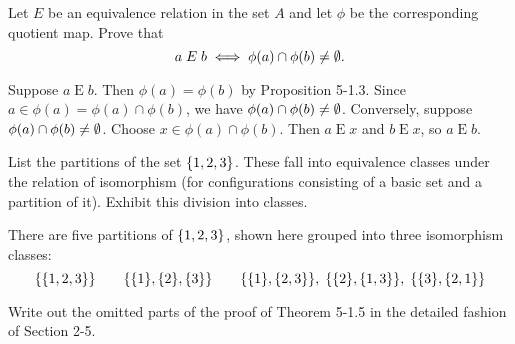 \documentclass{report}
\newcommand*{\Erel}{\mathrel{E}}
\begin{document}
\begin{exercise}
Let $E$ be an equivalence relation in the set $A$ and let $\phi$ be the corresponding quotient
map. Prove that
\[a\Erel b\iff \phi(a)\cap\phi(b)\neq\eset.\]
\end{exercise}

\begin{solution}
Suppose $a\Erel b$. Then $\phi(a)=\phi(b)$ by Proposition 5-1.3. Since $a\in\phi(a)=\phi(a)\cap\phi(b)$,
we have $\phi(a)\cap\phi(b)\neq\emptyset$.
Conversely, suppose $\phi(a)\cap\phi(b)\neq\emptyset$. Choose $x\in \phi(a)\cap\phi(b)$.
Then $a\Erel x$ and $b\Erel x$, so $a\Erel b$.
\end{solution}

\begin{exercise}
List the partitions of the set $\left\{1, 2,3\right\}$. These fall into equivalence classes under the
relation of isomorphism (for configurations consisting of a basic set and a partition of it).
Exhibit this division into classes.
\end{exercise}

\begin{solution}
There are five partitions of $\left\{1,2,3\right\}$, shown here grouped into three isomorphism classes:
\[
\set{\set{1,2,3}}\qquad
\set{\set{1},\set{2},\set{3}}\qquad
\set{\set{1},\set{2,3}},\thickspace\set{\set{2},\set{1,3}},\thickspace\set{\set{3},\set{2,1}}
\]
\end{solution}

\begin{exercise}
Write out the omitted parts of the proof of Theorem 5-1.5 in the detailed fashion
of Section 2-5.
\end{exercise}
\end{document}
